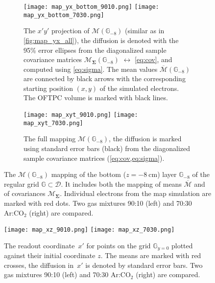 		\begin{figure}
			\centering
			\begin{subfigure}[t]{\textwidth}
				\centering
				\texttt{[image: map\_yx\_bottom\_9010.png]}
				\hfill
				\texttt{[image: map\_yx\_bottom\_7030.png]}
				\caption{The $x'y'$ projection of $\mathcal{M}(\mathbb{G}_{-8})$ (similar as in \cref{fig:map_yx_all}), the diffusion is denoted with the 95\% error ellipses from  the diagonalized sample covariance matrices $\mathcal{M}_\mathbf{\Sigma}(\mathbb{G}_{-8})$ $\leftrightarrow$ \cref{eq:cov}, and computed using \cref{eq:sigma}. The mean values $\overline{\mathcal{M}}(\mathbb{G}_{-8})$ are connected by black arrows with the corresponding starting position $(x,y)$ of the simulated electrons. The \ac{OFTPC} volume is marked with black lines.}
				\label{fig:map_yx_bot}
			\end{subfigure}
			
			\begin{subfigure}[t]{\textwidth}
				\centering
				\texttt{[image: map\_xyt\_9010.png]}
				\hfill
				\texttt{[image: map\_xyt\_7030.png]}
				\caption{The full mapping $\mathcal{M}(\mathbb{G}_{-8})$, the diffusion is marked using standard error bars (black) from the diagonalized sample covariance matrices (\cref{eq:cov,eq:sigma}).}
				\label{fig:map_xyt}
			\end{subfigure}
			\caption{The $\mathcal{M}(\mathbb{G}_{-8})$ mapping of the bottom ($z = \qty{-8}{\centi\meter}$) layer $\mathbb{G}_{-8}$ of the regular grid $\mathbb{G}\subset\mathcal{D}$. It includes both the mapping of means $\overline{\mathcal{M}}$ and of covariances $\mathcal{M}_\mathbf{\Sigma}$. Individual electrons from the map simulation are marked with red dots. Two gas mixtures 90:10 (left) and 70:30 Ar:CO$_2$ (right) are compared.}
			\label{fig:map_bot}
		\end{figure}
		
		\begin{figure}
			\centering
			\texttt{[image: map\_xz\_9010.png]}
			\hfill
			\texttt{[image: map\_xz\_7030.png]}
			\caption{The readout coordinate~$x'$ for points on the grid $\mathbb{G}_{y=0}$ plotted against their initial coordinate $z$. The means are marked with red crosses, the diffusion in~$x'$ is denoted by standard error bars. Two gas mixtures 90:10 (left) and 70:30 Ar:CO$_2$ (right) are compared.}
			\label{fig:map_xz}
		\end{figure}
		
